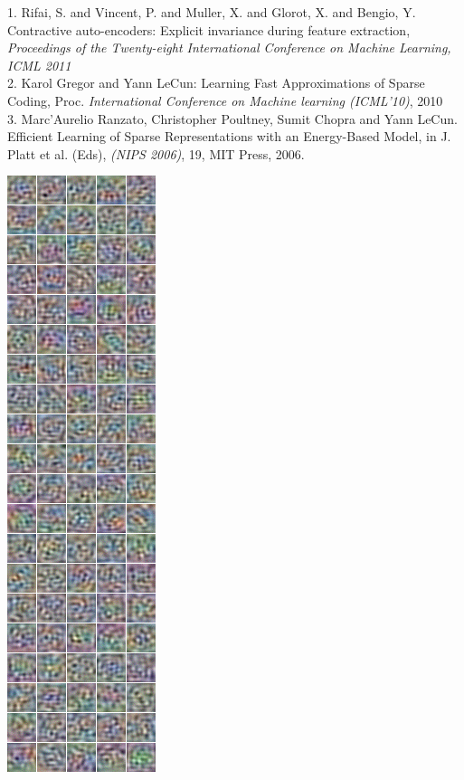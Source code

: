 \documentclass[paperwidth=38in,paperheight=28in,landscape,fontscale=0.4]{baposter}
\begin{document}
\begin{poster}
{
\footnotesize{
1. Rifai, S. and Vincent, P. and Muller, X. and Glorot, X. and Bengio, Y. Contractive auto-encoders: Explicit invariance during feature extraction, {\em Proceedings of the Twenty-eight International Conference on Machine Learning,  ICML 2011}\\
2. Karol Gregor and Yann LeCun: Learning Fast Approximations of Sparse Coding, Proc. {\em International Conference on Machine learning (ICML'10)}, 2010\\
3. Marc'Aurelio Ranzato, Christopher Poultney, Sumit Chopra and Yann LeCun. Efficient Learning of Sparse Representations with an Energy-Based Model, in J. Platt et al. (Eds), {\em(NIPS 2006)}, 19, MIT Press, 2006.}

}

{
\begin{center} 
\includegraphics[scale=0.366]{shrink_unreg.png}

\end{center}}
\end{poster}
\end{document}
